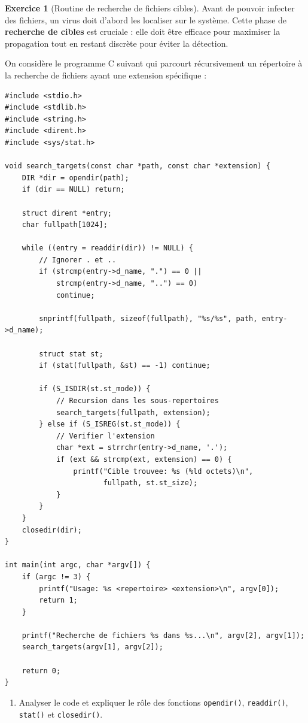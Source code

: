 \documentclass[a4paper,11pt]{article}
\theoremstyle{plain}
\theoremstyle{definition}
\newtheorem{exercice}{Exercice}
\begin{document}
\begin{exercice}[Routine de recherche de fichiers cibles]

Avant de pouvoir infecter des fichiers, un virus doit d'abord les localiser sur le système. Cette phase de \textbf{recherche de cibles} est cruciale : elle doit être efficace pour maximiser la propagation tout en restant discrète pour éviter la détection.

On considère le programme C suivant qui parcourt récursivement un répertoire à la recherche de fichiers ayant une extension spécifique :

\begin{verbatim}
#include <stdio.h>
#include <stdlib.h>
#include <string.h>
#include <dirent.h>
#include <sys/stat.h>

void search_targets(const char *path, const char *extension) {
    DIR *dir = opendir(path);
    if (dir == NULL) return;

    struct dirent *entry;
    char fullpath[1024];

    while ((entry = readdir(dir)) != NULL) {
        // Ignorer . et ..
        if (strcmp(entry->d_name, ".") == 0 ||
            strcmp(entry->d_name, "..") == 0)
            continue;

        snprintf(fullpath, sizeof(fullpath), "%s/%s", path, entry->d_name);

        struct stat st;
        if (stat(fullpath, &st) == -1) continue;

        if (S_ISDIR(st.st_mode)) {
            // Recursion dans les sous-repertoires
            search_targets(fullpath, extension);
        } else if (S_ISREG(st.st_mode)) {
            // Verifier l'extension
            char *ext = strrchr(entry->d_name, '.');
            if (ext && strcmp(ext, extension) == 0) {
                printf("Cible trouvee: %s (%ld octets)\n",
                       fullpath, st.st_size);
            }
        }
    }
    closedir(dir);
}

int main(int argc, char *argv[]) {
    if (argc != 3) {
        printf("Usage: %s <repertoire> <extension>\n", argv[0]);
        return 1;
    }

    printf("Recherche de fichiers %s dans %s...\n", argv[2], argv[1]);
    search_targets(argv[1], argv[2]);

    return 0;
}
\end{verbatim}

\begin{enumerate}
\item Analyser le code et expliquer le rôle des fonctions \texttt{opendir()}, \texttt{readdir()}, \texttt{stat()} et \texttt{closedir()}.


\end{enumerate}
\end{exercice}
\end{document}
